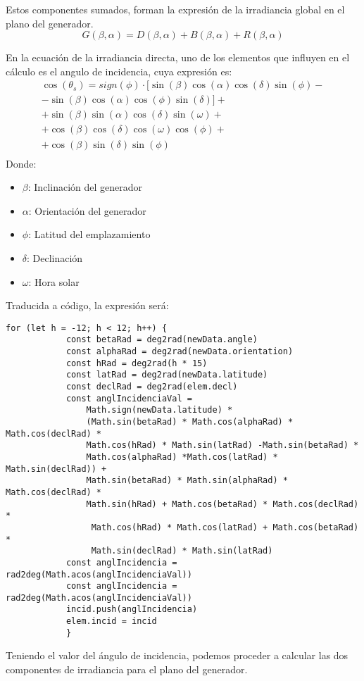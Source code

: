 Estos componentes sumados, forman la expresión de la irradiancia global en el plano del generador.
\begin{equation}
G(\beta,\alpha)=D(\beta,\alpha)+B(\beta,\alpha)+R(\beta,\alpha)
\end{equation}

En la ecuación de la irradiancia directa, uno de los elementos que influyen en el cálculo es el angulo de incidencia, cuya expresión es:
\begin{equation} \label{eqn_ang_incid}
\begin{split}
\cos(\theta_s)=sign(\phi)\cdot [ \sin(\beta)\cos(\alpha)\cos(\delta)\sin(\phi)- \\
-\sin(\beta)\cos(\alpha)\cos(\phi)\sin(\delta)]+ \\
+\sin(\beta)\sin(\alpha)\cos(\delta)\sin(\omega)+ \\
+\cos(\beta)\cos(\delta)\cos(\omega)\cos(\phi)+ \\
+\cos(\beta)\sin(\delta)\sin(\phi) \\
\end{split}
\end{equation}
Donde:
\begin{itemize}
\item \textbf{$\beta$}: Inclinación del generador
\item \textbf{$\alpha$}: Orientación del generador
\item \textbf{$\phi$}: Latitud del emplazamiento
\item \textbf{$\delta$}: Declinación
\item \textbf{$\omega$}: Hora solar
\end{itemize}
\newpage
Traducida a código, la expresión será:
\begin{lstlisting}[style=ES6, caption={Cálculo del ángulo de incidencia}]
		for (let h = -12; h < 12; h++) {
			const betaRad = deg2rad(newData.angle)
			const alphaRad = deg2rad(newData.orientation)
			const hRad = deg2rad(h * 15)
			const latRad = deg2rad(newData.latitude)
			const declRad = deg2rad(elem.decl)
			const anglIncidenciaVal =
				Math.sign(newData.latitude) *
				(Math.sin(betaRad) * Math.cos(alphaRad) * Math.cos(declRad) * 
				Math.cos(hRad) * Math.sin(latRad) -Math.sin(betaRad) * 
				Math.cos(alphaRad) *Math.cos(latRad) * Math.sin(declRad)) +
				Math.sin(betaRad) * Math.sin(alphaRad) * Math.cos(declRad) *
				Math.sin(hRad) + Math.cos(betaRad) * Math.cos(declRad) *
				 Math.cos(hRad) * Math.cos(latRad) + Math.cos(betaRad) * 
				 Math.sin(declRad) * Math.sin(latRad)
			const anglIncidencia = rad2deg(Math.acos(anglIncidenciaVal))
			const anglIncidencia = rad2deg(Math.acos(anglIncidenciaVal))
			incid.push(anglIncidencia)
			elem.incid = incid
			}
\end{lstlisting}
\newpage
Teniendo el valor del ángulo de incidencia, podemos proceder a calcular las dos componentes de irradiancia para el plano del generador.

